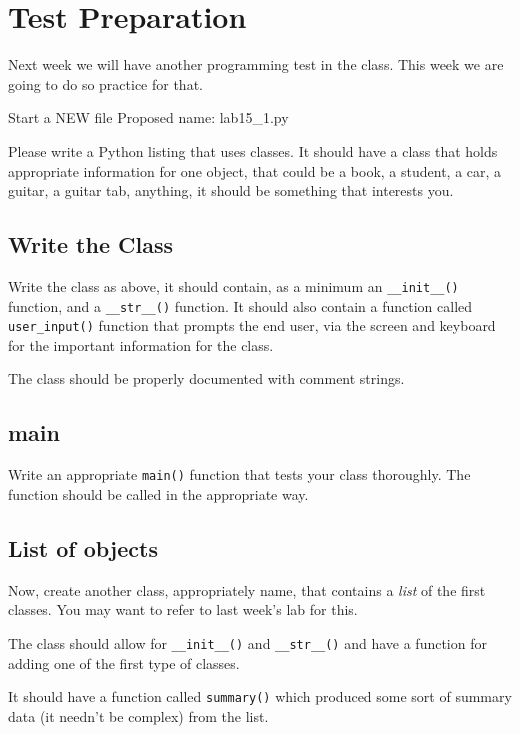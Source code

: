 \documentclass[12pt,oneside]{cttutorial}
\begin{document}
\section{Test Preparation}

Next week we will have another programming test in the class. This week we are going to do so practice for that.

\alert{Start a NEW file}
Proposed name: lab15\_1.py

Please write a Python listing that uses classes. It should have a class that holds appropriate information for one object, that could be a book, a student, a car, a guitar, a guitar tab, anything, it should be something that interests you.

\subsection{Write the Class}

Write the class as above, it should contain, as a minimum an \lstinline!__init__()! function, and a \lstinline!__str__()! function. It should also contain a function called \lstinline!user_input()! function that prompts the end user, via the screen and keyboard for the important information for the class.

The class should be properly documented with comment strings.

\subsection{main}

Write an appropriate \lstinline!main()! function that tests your class thoroughly. The function should be called in the appropriate way.

\subsection{List of objects}

Now, create another class, appropriately name, that contains a \emph{list} of the first classes. You may want to refer to last week's lab for this.

The class should allow for \lstinline!__init__()! and \lstinline!__str__()! and have a function for adding one of the first type of classes.

It should have a function called \lstinline!summary()! which produced some sort of summary data (it needn't be complex) from the list.
\end{document}
